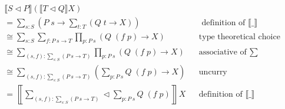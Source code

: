 \begin{code}%
\>[0]\AgdaSpace{}%
\AgdaSymbol{:}\AgdaSpace{}%
\AgdaSpace{}%
\AgdaSpace{}%
\AgdaSpace{}%
\AgdaSpace{}%
\<%
\\
\>[0]\AgdaSymbol{(}\AgdaSpace{}%
\AgdaSpace{}%
\AgdaSymbol{)}\AgdaSpace{}%
\AgdaSpace{}%
\AgdaSymbol{(}\AgdaSpace{}%
\AgdaSpace{}%
\AgdaSymbol{)}\AgdaSpace{}%
\AgdaSymbol{=}\AgdaSpace{}%
\AgdaSymbol{(}\AgdaFunction{Σ[}\AgdaSpace{}%
\AgdaSpace{}%
\AgdaSpace{}%
\AgdaSpace{}%
\AgdaFunction{]}\AgdaSpace{}%
\AgdaSymbol{(}\AgdaSpace{}%
\AgdaSpace{}%
\AgdaSpace{}%
\AgdaSymbol{))}\AgdaSpace{}%
\AgdaSpace{}%
\AgdaSpace{}%
\AgdaSymbol{(}\AgdaSpace{}%
\AgdaOperator{\AgdaInductiveConstructor{,}}\AgdaSpace{}%
\AgdaSymbol{)}\AgdaSpace{}%
\AgdaSpace{}%
\AgdaFunction{Σ[}\AgdaSpace{}%
\AgdaSpace{}%
\AgdaSpace{}%
\AgdaSpace{}%
\AgdaSpace{}%
\AgdaFunction{]}\AgdaSpace{}%
\AgdaSpace{}%
\AgdaSymbol{(}\AgdaSpace{}%
\AgdaSymbol{)}\<%
\end{code}

\begin{align*}
& \llbracket S \triangleleft P \rrbracket (\llbracket T \triangleleft Q \rrbracket X) \\
&= \sum_{s : S} \left( P \; s \to \sum_{t : T} (Q \; t \to X) \right) && \text{ definition of $\llbracket \_ \rrbracket$} \\
&\cong \sum_{s : S} \sum_{f : P \: s \to T} \prod_{p : P \: s} (Q \; (f \; p) \to X) && \text{type theoretical choice} \\
&\cong \sum_{(s , f) : \sum_{s : S} ( P \: s \to T )} \prod_{p : P \: s} (Q \; (f \; p) \to X) && \text{associative of $\sum$} \\
&\cong \sum_{(s , f) : \sum_{s : S} ( P \: s \to T )} \left( \sum_{p : P \: s} Q \; (f \; p) \to X \right) && \text{uncurry} \\
&= \left\llbracket \sum_{(s , f) : \sum_{s : S} ( P \: s \to T )} \triangleleft \sum_{p : P \: s} Q \; (f \; p) \right\rrbracket X && \text{definition of $\llbracket \_ \rrbracket$} \\
\end{align*}

